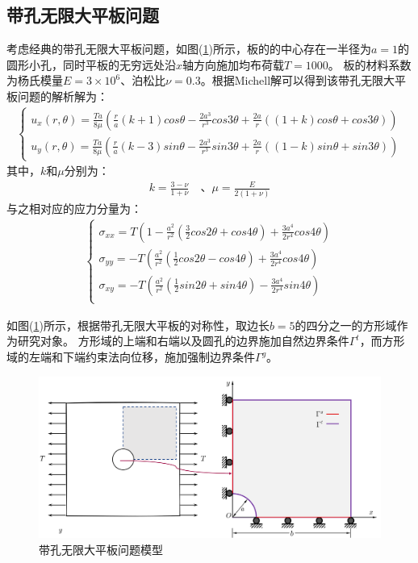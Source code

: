 \subsection{带孔无限大平板问题}
考虑经典的带孔无限大平板问题，如图(\ref{hole})所示，板的的中心存在一半径为$a=1$的圆形小孔，同时平板的无穷远处沿$x$轴方向施加均布荷载$T=1000$。
板的材料系数为杨氏模量$E=3\times10^6$、泊松比$\nu=0.3$。根据Michell解可以得到该带孔无限大平板问题的解析解为：
\begin{equation}
\begin{split}
\begin{cases}
    u_x(r,\theta)=\frac{Ta}{8\mu}(\frac{r}{a}(k+1)cos\theta-\frac{2a^3}{r^3}cos3\theta+\frac{2a}{r}((1+k)cos\theta+cos3\theta))\\
    u_y(r,\theta)=\frac{Ta}{8\mu}(\frac{r}{a}(k-3)sin\theta-\frac{2a^3}{r^3}sin3\theta+\frac{2a}{r}((1-k)sin\theta+sin3\theta))  
\end{cases}
\end{split}
\end{equation}
其中，$k$和$\mu$分别为：
\begin{equation}
\begin{split}
    k=\frac{3-\nu}{1+\nu}\quad \text{、}\mu=\frac{E}{2(1+\nu)}
\end{split}
\end{equation}
与之相对应的应力分量为：
\begin{equation}
\begin{split}
\begin{cases}
    \sigma_{xx}=T(1-\frac{a^2}{r^2}(\frac{3}{2}cos2\theta+cos4\theta)+\frac{3a^4}{2r^4}cos4\theta)\\
    \sigma_{yy}=-T(\frac{a^2}{r^2}(\frac{1}{2}cos2\theta-cos4\theta)+\frac{3a^4}{2r^4}cos4\theta)\\
    \sigma_{xy}=-T(\frac{a^2}{r^2}(\frac{1}{2}sin2\theta+sin4\theta)-\frac{3a^4}{2r^4}sin4\theta)\\
\end{cases}
\end{split}
\end{equation}\par
如图(\ref{hole})所示，根据带孔无限大平板的对称性，取边长$b=5$的四分之一的方形域作为研究对象。
方形域的上端和右端以及圆孔的边界施加自然边界条件$\Gamma^t$，而方形域的左端和下端约束法向位移，施加强制边界条件$\Gamma^g$。
\begin{figure}[H]
\centering
\includegraphics[scale=0.5]{figure/EHR/hole/hole.png}
    \caption{带孔无限大平板问题模型}\label{hole}
\end{figure}
